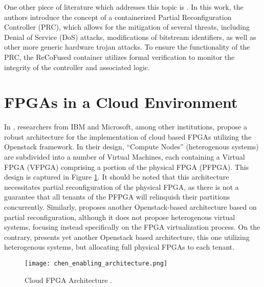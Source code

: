 One other piece of literature which addresses this topic is \cite{ustaoglu_recofused_2020}. In this work, the authors introduce the concept of a containerized Partial Reconfiguration Controller (PRC), which allows for the mitigation of several threats, including Denial of Service (DoS) attacks, modifications of bitstream identifiers, as well as other more generic hardware trojan attacks. To ensure the functionality of the PRC, the ReCoFused container utilizes formal verification to monitor the integrity of the controller and associated logic.

\section{FPGAs in a Cloud Environment}\label{sec:fpgaCloud}
In \cite{chen_enabling_2014}, researchers from IBM and Microsoft, among other institutions, propose a robust architecture for the implementation of cloud based FPGAs utilizing the Openstack framework. In their design, ``Compute Nodes'' (heterogenous systems) are subdivided into a number of Virtual Machines, each containing a Virtual FPGA (VFPGA) comprising a portion of the physical FPGA (PFPGA). This design is captured in Figure \ref{fig:chen_enabling_architecture}. It should be noted that this architecture necessitates partial reconfiguration of the physical FPGA, as there is not a guarantee that all tenants of the PFPGA will relinquish their partitions concurrently. Similarly, \cite{byma_fpgas_2014} proposes another Openstack-based architecture based on partial reconfiguration, although it does not propose heterogenous virtual systems, focusing instead specifically on the FPGA virtualization process. On the contrary, \cite{tarafdar_designing_2018} presents yet another Openstack based architecture, this one utilizing heterogenous systems, but allocating full physical FPGAs to each tenant.

\begin{figure}
    \centering
    \texttt{[image: chen\_enabling\_architecture.png]}
    \caption[Cloud FPGA Architecture]{Cloud FPGA Architecture \cite{chen_enabling_2014}.}
    \label{fig:chen_enabling_architecture}
\end{figure}



